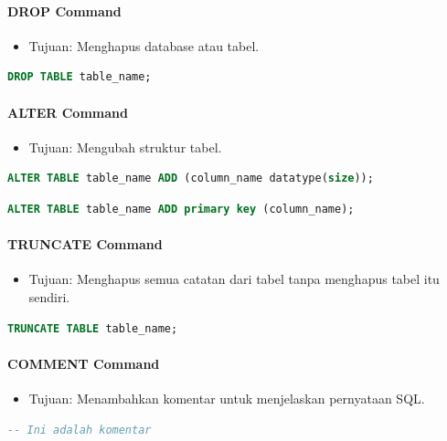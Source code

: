 \documentclass{article}
\begin{document}
\paragraph{DROP Command}
\begin{itemize}
    \item Tujuan: Menghapus database atau tabel.
\end{itemize}
\begin{lstlisting}[language=SQL, caption={Sintaks DROP Command}, captionpos=b]
DROP TABLE table_name;
\end{lstlisting}
\paragraph{ALTER Command}
\begin{itemize}
    \item Tujuan: Mengubah struktur tabel.
\end{itemize}
\begin{lstlisting}[language=SQL, caption={Sintaks ALTER Command untuk Menambah Kolom}, captionpos=b]
ALTER TABLE table_name ADD (column_name datatype(size));
\end{lstlisting}
\begin{lstlisting}[language=SQL, caption={Sintaks ALTER Command untuk Menambah Primary Key}, captionpos=b]
ALTER TABLE table_name ADD primary key (column_name);
\end{lstlisting}
\paragraph{TRUNCATE Command}
\begin{itemize}
    \item Tujuan: Menghapus semua catatan dari tabel tanpa menghapus tabel itu sendiri.
\end{itemize}
\begin{lstlisting}[language=SQL, caption={Sintaks TRUNCATE Command}, captionpos=b]
TRUNCATE TABLE table_name;
\end{lstlisting}
\paragraph{COMMENT Command}
\begin{itemize}
    \item Tujuan: Menambahkan komentar untuk menjelaskan pernyataan SQL.\@
\end{itemize}
\begin{lstlisting}[language=SQL, caption={Sintaks COMMENT Command}, captionpos=b]
-- Ini adalah komentar
\end{lstlisting}
\end{document}
